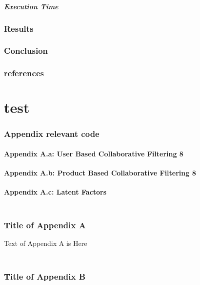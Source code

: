 \documentclass{article}
\begin{document}
\subsubsection{Execution Time}
\cite{ApacheSpark:1}
\cite{RecommenderSystems:2}
\cite{MovieLens:3}

\section{Results}
\section{Conclusion}
\section{references}

\appendix
\part{test}
\section{Appendix relevant code}
\subsection{Appendix A.a: User Based Collaborative Filtering	8}
\subsection{Appendix A.b: Product Based Collaborative Filtering	8}
\subsection{Appendix A.c: Latent Factors}
\section{\\Title of Appendix A}

Text of Appendix A is Here

\section{\\Title of Appendix B}
\end{document}
